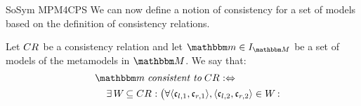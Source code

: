 \begin{copiedFrom}{SoSym MPM4CPS}
We can now define a notion of consistency for a set of models based on the definition of consistency relations.

\begin{definition}[Consistency] \label{def:consistency}
    Let $CR_{}$ be a consistency relation %
    and let $\modelset{m} \in \metamodelinstances{\metamodelset{M}}$ %
    be a set of models of the metamodels in $\metamodelset{M}$.
    We say that:
     \begin{align*}
        \formulaskip
        & 
        \modelset{m} \mathtext{consistent to} \consistencyrelation{CR}{} \equivalentperdefinition \\
        & \formulaskip
        \exists \consistencyrelation{W}{} \subseteq \consistencyrelation{CR}{} : 
        \bigl( \forall \tupled{\conditionelement{c}{l,1}, \conditionelement{c}{r,1}}, \tupled{\conditionelement{c}{l,2}, \conditionelement{c}{r,2}} \in \consistencyrelation{W}{} : \\

\end{align*}
\end{definition}
\end{copiedFrom}
